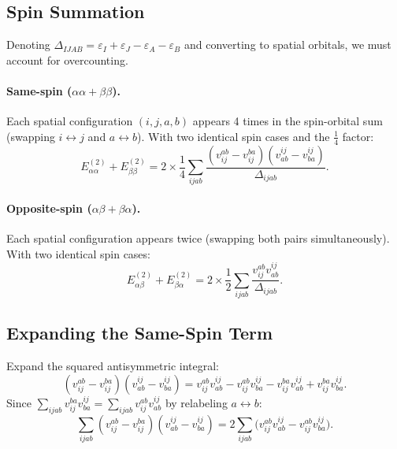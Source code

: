 \documentclass[a4paper,12pt,oneside]{book}
\begin{document}
\subsection{Spin Summation}
Denoting $\Delta_{IJAB} = \varepsilon_I + \varepsilon_J - \varepsilon_A - \varepsilon_B$
and converting to spatial orbitals, we must account for overcounting.

\paragraph{Same-spin ($\alpha\alpha + \beta\beta$).}
Each spatial configuration $(i,j,a,b)$ appears 4 times in the spin-orbital sum
(swapping $i \leftrightarrow j$ and $a \leftrightarrow b$). With two identical 
spin cases and the $\tfrac{1}{4}$ factor:
\begin{equation}
E^{(2)}_{\alpha\alpha} + E^{(2)}_{\beta\beta} 
= 2 \times \frac{1}{4} \sum_{ijab} \frac{(v_{ij}^{ab} - v_{ij}^{ba})(v_{ab}^{ij} - v_{ba}^{ij})}{\Delta_{ijab}}.
\end{equation}

\paragraph{Opposite-spin ($\alpha\beta + \beta\alpha$).}
Each spatial configuration appears twice (swapping both pairs simultaneously).
With two identical spin cases:
\begin{equation}
E^{(2)}_{\alpha\beta} + E^{(2)}_{\beta\alpha} 
= 2 \times \frac{1}{2} \sum_{ijab} \frac{v_{ij}^{ab}v_{ab}^{ij}}{\Delta_{ijab}}.
\end{equation}

\subsection{Expanding the Same-Spin Term}
Expand the squared antisymmetric integral:
\begin{equation}
(v_{ij}^{ab} - v_{ij}^{ba})(v^{ij}_{ab} - v^{ij}_{ba}) 
= v_{ij}^{ab}v^{ij}_{ab} - v_{ij}^{ab}v^{ij}_{ba} - v_{ij}^{ba}v^{ij}_{ab} + v_{ij}^{ba}v^{ij}_{ba}.
\end{equation}
Since $\sum_{ijab} v_{ij}^{ba}v^{ij}_{ba} = \sum_{ijab} v_{ij}^{ab}v^{ij}_{ab}$ 
by relabeling $a \leftrightarrow b$:
\begin{equation}
\sum_{ijab} (v_{ij}^{ab} - v_{ij}^{ba})(v^{ij}_{ab} - v^{ij}_{ba}) 
= 2 \sum_{ijab} \bigl(v_{ij}^{ab}v^{ij}_{ab}  - v_{ij}^{ab}v^{ij}_{ba}\bigr).
\end{equation}
\end{document}
